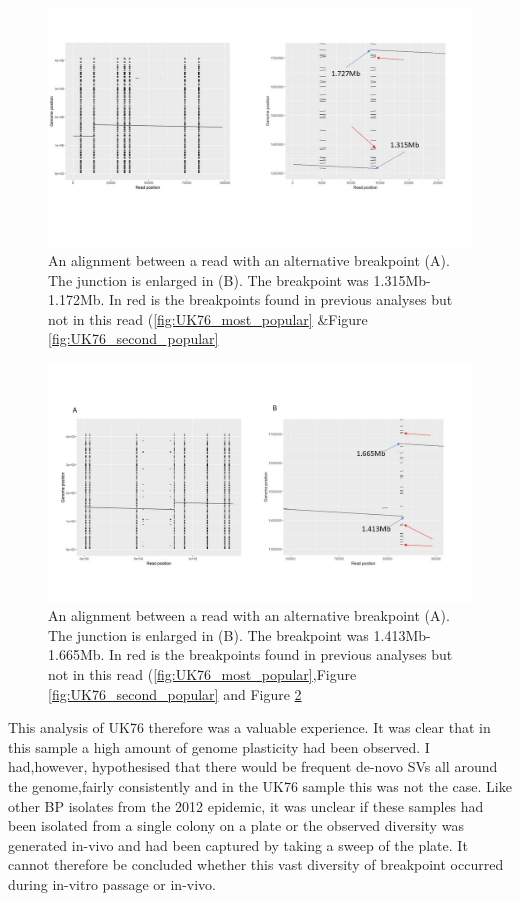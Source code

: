 \documentclass{article}
\begin{document}
\begin{figure}[h!]
\centering
\includegraphics[width=\textwidth{}]{Chapter_2/third unique.jpg}
\caption{An alignment between a read with an alternative breakpoint (A). The junction is enlarged in (B). The breakpoint was 1.315Mb-1.172Mb. In red is the breakpoints found in previous analyses but not in this read (\ref{fig:UK76_most_popular} \&Figure \ref{fig:UK76_second_popular}}
\label{fig:UK76_third}
\end{figure}


\begin{figure}[h!]
\centering
\includegraphics[width=\textwidth{}]{Chapter_2/junction 4.jpg}
\caption{An alignment between a read with an alternative breakpoint (A). The junction is enlarged in (B). The breakpoint was 1.413Mb-1.665Mb. In red is the breakpoints found in previous analyses but not in this read (\ref{fig:UK76_most_popular},Figure \ref{fig:UK76_second_popular} and Figure \ref{fig:UK76_fourth}}
\label{fig:UK76_fourth}
\end{figure}

This analysis of UK76 therefore was a valuable experience. It was clear that in this sample a high amount of genome plasticity had been observed. I had,however, hypothesised that there would be frequent de-novo SVs all around the genome,fairly consistently and in the UK76 sample this was not the case. Like other BP isolates from the 2012 epidemic, it was unclear if these samples had been isolated from a single colony on a plate or the observed diversity was generated in-vivo and had been captured by taking a sweep of the plate. It cannot therefore be concluded whether this vast diversity of breakpoint occurred during in-vitro passage or in-vivo.
\end{document}
